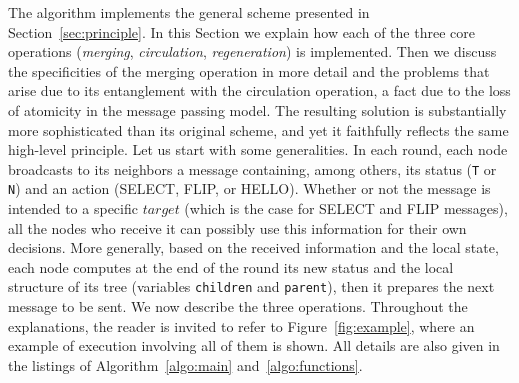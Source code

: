 \documentclass[twocolumn]{article}
\begin{document}
The algorithm implements the general scheme presented in
Section~\ref{sec:principle}. In this Section we explain how each of
the three core operations ({\em merging}, {\em circulation}, {\em
  regeneration}) is implemented. Then we discuss the specificities of
the merging operation in more detail and the problems that arise due
to its entanglement with the circulation operation, a fact due to the
loss of atomicity in the message passing model. The resulting solution
is substantially more sophisticated than its original scheme, and yet
it faithfully reflects the same high-level principle. Let us start
with some generalities. In each round, each node broadcasts to its
neighbors a message containing, among others, its status ({\tt T} or
{\tt N}) and an action (SELECT, FLIP, or HELLO). Whether or not the
message is intended to a specific $target$ (which is the case for
SELECT and FLIP messages), all the nodes who receive it can possibly
use this information for their own decisions. More generally, based on
the received information and the local state, each node computes at
the end of the round its new status and the local structure of its
tree (variables \texttt{children} and \texttt{parent}), then it
prepares the next message to be sent. We now describe the three
operations. Throughout the explanations, the reader is invited to
refer to Figure~\ref{fig:example}, where an example of execution
involving all of them is shown. All details are also given in the
listings of Algorithm~\ref{algo:main} and~\ref{algo:functions}.
\end{document}
